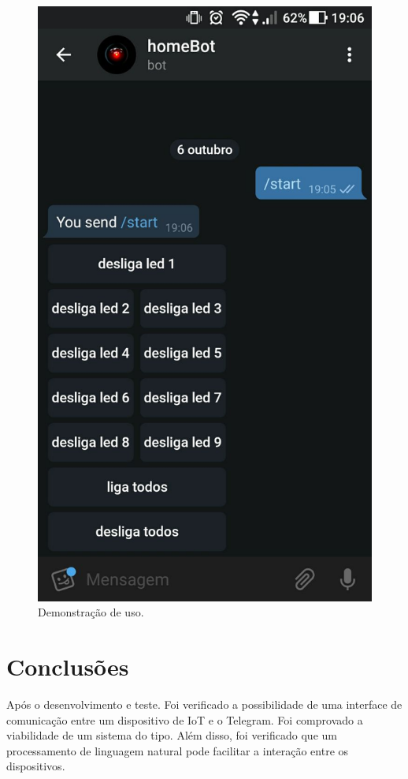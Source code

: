 \documentclass[10pt,a4paper,twocolumn]{article}
\begin{document}
 
\begin{figure}[h]
\includegraphics[scale=0.1]{img-1}
\caption{Demonstração de uso.}
\end{figure}


\section{\bf Conclusões}
Após o desenvolvimento e teste. Foi verificado a possibilidade de uma interface de comunicação entre um dispositivo de  IoT e o Telegram. Foi comprovado a viabilidade de um sistema do tipo. Além disso, foi verificado que um processamento de linguagem natural pode facilitar a interação entre os dispositivos.
\end{document}
